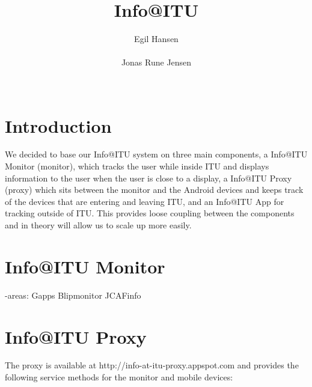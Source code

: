 \documentclass{ubicomp2011}
\begin{document}
\setlength{\paperheight}{11in}
\setlength{\paperwidth}{8.5in}
\setlength{\pdfpageheight}{\paperheight}
\setlength{\pdfpagewidth}{\paperwidth}

\toappear{}



\title{Info@ITU}
\author{
  \alignauthor Egil Hansen\\
    \\
 \alignauthor Jonas Rune Jensen\\
    \\
    }

\maketitle

\section{Introduction}

We decided to base our Info@ITU system on three main components, a Info@ITU Monitor (monitor), which tracks the user while inside ITU and displays information to the user when the user is close to a display, a Info@ITU Proxy (proxy) which sits between the monitor and the Android devices and keeps track of the devices that are entering and leaving ITU, and an Info@ITU App for tracking outside of ITU. This provides loose coupling between the components and in theory will allow us to scale up more easily.

\section{Info@ITU Monitor}

-areas:
Gapps
Blipmonitor
JCAFinfo
\section{Info@ITU Proxy}

The proxy is available at http://info-at-itu-proxy.appspot.com and provides the following service methods for the monitor and mobile devices:
\end{document}
